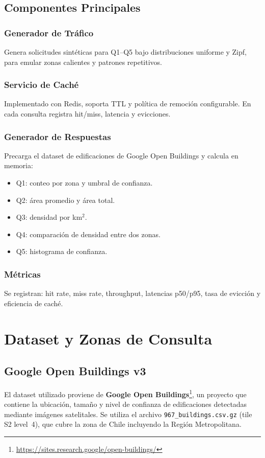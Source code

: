 \documentclass[letter,12pt]{article}
\begin{document}
\subsection{Componentes Principales}
\subsubsection{Generador de Tráfico}
Genera solicitudes sintéticas para Q1--Q5 bajo distribuciones uniforme y Zipf, para emular zonas calientes y patrones repetitivos.

\subsubsection{Servicio de Caché}
Implementado con Redis, soporta TTL y política de remoción configurable. En cada consulta registra hit/miss, latencia y evicciones.

\subsubsection{Generador de Respuestas}
Precarga el dataset de edificaciones de Google Open Buildings y calcula en memoria:
\begin{itemize}
  \item Q1: conteo por zona y umbral de confianza.
  \item Q2: área promedio y área total.
  \item Q3: densidad por km$^2$.
  \item Q4: comparación de densidad entre dos zonas.
  \item Q5: histograma de confianza.
\end{itemize}

\subsubsection{Métricas}
Se registran: hit rate, miss rate, throughput, latencias p50/p95, tasa de evicción y eficiencia de caché.

\section{Dataset y Zonas de Consulta}

\subsection{Google Open Buildings v3}
El dataset utilizado proviene de \textbf{Google Open Buildings}\footnote{\url{https://sites.research.google/open-buildings/}}, un proyecto que contiene la ubicación, tamaño y nivel de confianza de edificaciones detectadas mediante imágenes satelitales. Se utiliza el archivo \texttt{967\_buildings.csv.gz} (tile S2 level~4), que cubre la zona de Chile incluyendo la Región Metropolitana.
\end{document}
